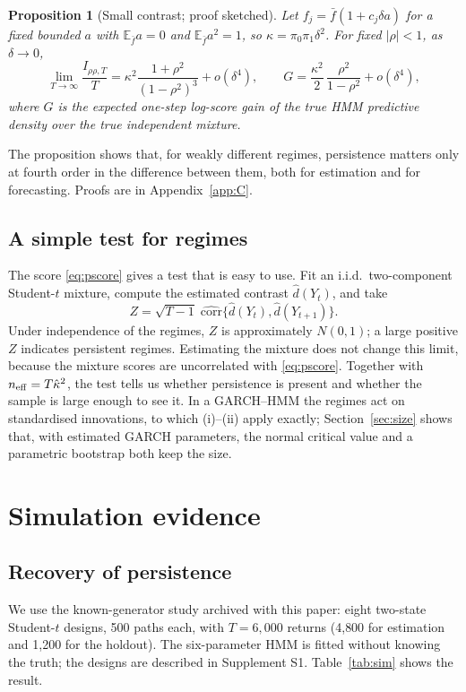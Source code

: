 \documentclass[12pt,letterpaper]{article}
\newcommand{\E}{\mathbb{E}}
\theoremstyle{plain}
\newtheorem{proposition}{Proposition}
\theoremstyle{remark}
\begin{document}
\begin{proposition}[Small contrast; proof sketched]\label{prop:small}
Let $f_j=\bar f(1+c_j\delta a)$ for a fixed bounded $a$ with $\E_{\bar f}a=0$ and $\E_{\bar f}a^2=1$, so $\kappa=\pi_0\pi_1\delta^2$. For fixed $|\rho|<1$, as $\delta\to0$,
\begin{equation}\label{eq:small}
\lim_{T\to\infty}\frac{I_{\rho\rho,T}}{T}=\kappa^2\frac{1+\rho^2}{(1-\rho^2)^3}+o(\delta^4),\qquad
G=\frac{\kappa^2}{2}\,\frac{\rho^2}{1-\rho^2}+o(\delta^4),
\end{equation}
where $G$ is the expected one-step log-score gain of the true HMM predictive density over the true independent mixture.
\end{proposition}

The proposition shows that, for weakly different regimes, persistence matters only at fourth order in the difference between them, both for estimation and for forecasting. Proofs are in Appendix~\ref{app:C}.

\subsection{A simple test for regimes}\label{sec:test}
The score \eqref{eq:pscore} gives a test that is easy to use. Fit an i.i.d.\ two-component Student-$t$ mixture, compute the estimated contrast $\hat d(Y_t)$, and take
\[
Z=\sqrt{T-1}\;\widehat{\mathrm{corr}}\{\hat d(Y_t),\hat d(Y_{t+1})\}.
\]
Under independence of the regimes, $Z$ is approximately $N(0,1)$; a large positive $Z$ indicates persistent regimes. Estimating the mixture does not change this limit, because the mixture scores are uncorrelated with \eqref{eq:pscore}. Together with $n_{\rm eff}=T\hat\kappa^2$, the test tells us whether persistence is present and whether the sample is large enough to see it. In a GARCH--HMM the regimes act on standardised innovations, to which (i)--(ii) apply exactly; Section~\ref{sec:size} shows that, with estimated GARCH parameters, the normal critical value and a parametric bootstrap both keep the size.

\section{Simulation evidence}\label{sec:sim}

\subsection{Recovery of persistence}
We use the known-generator study archived with this paper: eight two-state Student-$t$ designs, 500 paths each, with $T=6{,}000$ returns (4{,}800 for estimation and 1{,}200 for the holdout). The six-parameter HMM is fitted without knowing the truth; the designs are described in Supplement S1. Table~\ref{tab:sim} shows the result.
\end{document}
